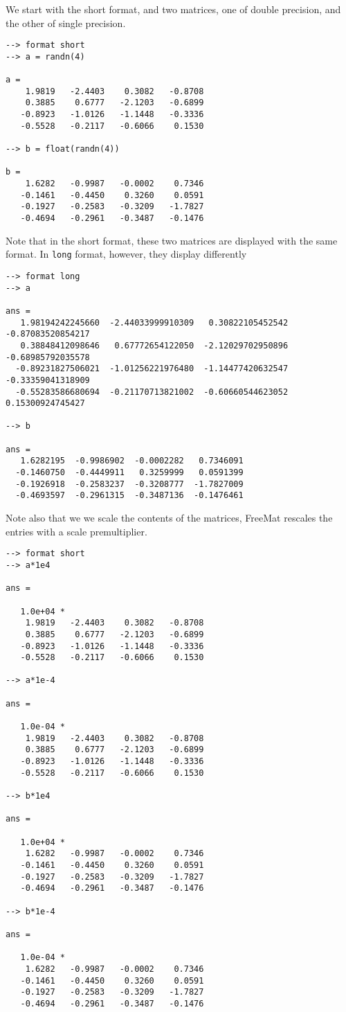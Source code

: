 We start with the short format, and two matrices, one of double precision, and the
other of single precision.
\begin{verbatim}
--> format short
--> a = randn(4)

a = 
    1.9819   -2.4403    0.3082   -0.8708 
    0.3885    0.6777   -2.1203   -0.6899 
   -0.8923   -1.0126   -1.1448   -0.3336 
   -0.5528   -0.2117   -0.6066    0.1530 

--> b = float(randn(4))

b = 
    1.6282   -0.9987   -0.0002    0.7346 
   -0.1461   -0.4450    0.3260    0.0591 
   -0.1927   -0.2583   -0.3209   -1.7827 
   -0.4694   -0.2961   -0.3487   -0.1476 
\end{verbatim}
Note that in the short format, these two matrices are displayed with the same format.
In \verb|long| format, however, they display differently
\begin{verbatim}
--> format long
--> a

ans = 
   1.98194242245660  -2.44033999910309   0.30822105452542  -0.87083520854217 
   0.38848412098646   0.67772654122050  -2.12029702950896  -0.68985792035578 
  -0.89231827506021  -1.01256221976480  -1.14477420632547  -0.33359041318909 
  -0.55283586680694  -0.21170713821002  -0.60660544623052   0.15300924745427 

--> b

ans = 
   1.6282195  -0.9986902  -0.0002282   0.7346091 
  -0.1460750  -0.4449911   0.3259999   0.0591399 
  -0.1926918  -0.2583237  -0.3208777  -1.7827009 
  -0.4693597  -0.2961315  -0.3487136  -0.1476461 
\end{verbatim}
Note also that we we scale the contents of the matrices, FreeMat rescales the entries
with a scale premultiplier.
\begin{verbatim}
--> format short
--> a*1e4

ans = 

   1.0e+04 * 
    1.9819   -2.4403    0.3082   -0.8708 
    0.3885    0.6777   -2.1203   -0.6899 
   -0.8923   -1.0126   -1.1448   -0.3336 
   -0.5528   -0.2117   -0.6066    0.1530 

--> a*1e-4

ans = 

   1.0e-04 * 
    1.9819   -2.4403    0.3082   -0.8708 
    0.3885    0.6777   -2.1203   -0.6899 
   -0.8923   -1.0126   -1.1448   -0.3336 
   -0.5528   -0.2117   -0.6066    0.1530 

--> b*1e4

ans = 

   1.0e+04 * 
    1.6282   -0.9987   -0.0002    0.7346 
   -0.1461   -0.4450    0.3260    0.0591 
   -0.1927   -0.2583   -0.3209   -1.7827 
   -0.4694   -0.2961   -0.3487   -0.1476 

--> b*1e-4

ans = 

   1.0e-04 * 
    1.6282   -0.9987   -0.0002    0.7346 
   -0.1461   -0.4450    0.3260    0.0591 
   -0.1927   -0.2583   -0.3209   -1.7827 
   -0.4694   -0.2961   -0.3487   -0.1476 
\end{verbatim}
